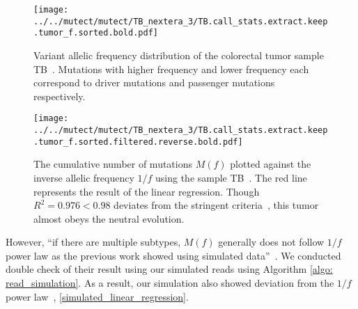 \documentclass{article}
\begin{document}
\begin{figure}[H]
 \begin{minipage}[c]{0.47\hsize}
 \begin{center}
  \texttt{[image: ../../mutect/mutect/TB\_nextera\_3/TB.call\_stats.extract.keep.tumor\_f.sorted.bold.pdf]}
 \end{center}
    \caption{
  Variant allelic frequency distribution of the colorectal tumor sample TB~\cite{williams2016identification}.
  Mutations with higher frequency and lower frequency each correspond to driver mutations and passenger mutations respectively.
  }\label{TB_vaf}
\end{minipage}
 \hspace{1truecm}
\begin{minipage}[c]{0.47\hsize}
 \begin{center}
 \texttt{[image: ../../mutect/mutect/TB\_nextera\_3/TB.call\_stats.extract.keep.tumor\_f.sorted.filtered.reverse.bold.pdf]}
 \end{center}
   \caption{
  The cumulative number of mutations $M(f)$ plotted against the inverse allelic frequency $1/f$
  using the sample TB~\cite{williams2016identification}.
  The red line represents the result of the linear regression.
 Though $R^2 = 0.976 < 0.98$ deviates from the stringent criteria~\cite{williams2016identification}, this tumor almost obeys the neutral evolution.
  }
 \label{TB_linear_regression}
\end{minipage}
\end{figure}

However, ``if there are multiple subtypes, $M(f)$ generally does not follow $1/f$ power law as the previous work showed using simulated data''~\cite{williams2016identification}.
We conducted double check of their result using our simulated reads using Algorithm \ref{algo: read_simulation}. As a result, our simulation also showed deviation from the $1/f$ power law~, \ref{simulated_linear_regression}.
\end{document}
